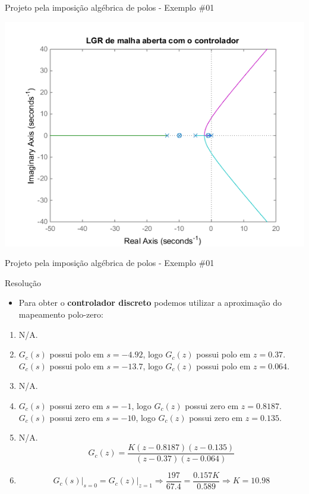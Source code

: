 \begin{frame}{Projeto pela imposição algébrica de polos - Exemplo \#01}
\centerline{\includegraphics[width=0.8\linewidth]{Figuras/Ch10/fig5.png}}
\end{frame}

\begin{frame}{Projeto pela imposição algébrica de polos - Exemplo \#01}
\begin{block}{Resolução}
\begin{itemize}
    \item Para obter o \textbf{controlador discreto} podemos utilizar a aproximação do mapeamento polo-zero:
\end{itemize}

	\begin{enumerate}
		\item N/A.
		\item $ G_c(s) $ possui polo em $ s=-\num{4,92} $, logo $ G_c(z) $ possui polo em $z=\num{0,37} $.
		$ G_c(s) $ possui polo em $ s=-\num{13,7} $, logo $ G_c(z) $ possui polo em $z=\num{0,064} $.
		\item N/A.
		\item $ G_c(s) $ possui zero em $ s=-\num{1} $, logo $ G_c(z) $ possui zero em $z=\num{0,8187} $.
		$ G_c(s) $ possui zero em $ s=-\num{10} $, logo $ G_c(z) $ possui zero em $z=\num{0,135} $.
		\item N/A. 
		\[ G_c(z)=\dfrac{K(z-\num{0,8187})(z-\num{0,135})}{(z-\num{0,37})(z-\num{0,064})} \]
		\vspace{-0.7cm}
		\item
		\[
		G_c(s)\Big|_{s=0}=G_c(z)\Big|_{z=1}\Rightarrow \dfrac{\num{197}}{\num{67,4}}=\dfrac{\num{0,157}K}{\num{0,589}}\Rightarrow K=\num{10,98} \]
	\end{enumerate}
\end{block}
\end{frame}

